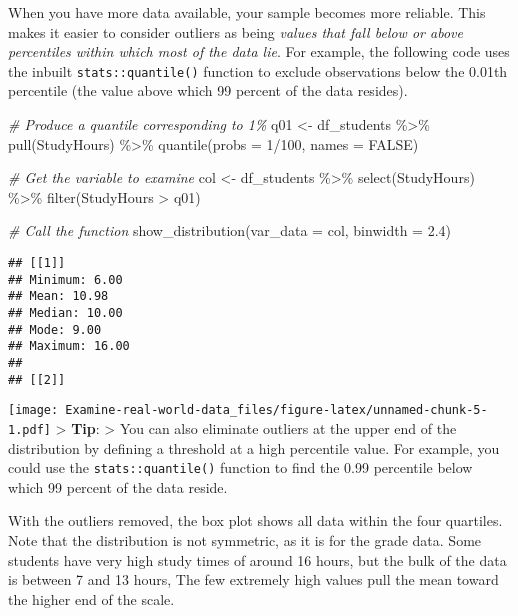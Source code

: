 \documentclass[
]{article}
\newenvironment{Shaded}{\begin{snugshade}}{\end{snugshade}}
\newcommand{\AttributeTok}[1]{\textcolor[rgb]{0.77,0.63,0.00}{#1}}
\newcommand{\CommentTok}[1]{\textcolor[rgb]{0.56,0.35,0.01}{\textit{#1}}}
\newcommand{\ConstantTok}[1]{\textcolor[rgb]{0.00,0.00,0.00}{#1}}
\newcommand{\DecValTok}[1]{\textcolor[rgb]{0.00,0.00,0.81}{#1}}
\newcommand{\FloatTok}[1]{\textcolor[rgb]{0.00,0.00,0.81}{#1}}
\newcommand{\FunctionTok}[1]{\textcolor[rgb]{0.00,0.00,0.00}{#1}}
\newcommand{\NormalTok}[1]{#1}
\newcommand{\OtherTok}[1]{\textcolor[rgb]{0.56,0.35,0.01}{#1}}
\newcommand{\SpecialCharTok}[1]{\textcolor[rgb]{0.00,0.00,0.00}{#1}}
\begin{document}
When you have more data available, your sample becomes more reliable.
This makes it easier to consider outliers as being \emph{values that
fall below or above percentiles within which most of the data lie}. For
example, the following code uses the inbuilt \texttt{stats::quantile()}
function to exclude observations below the 0.01th percentile (the value
above which 99 percent of the data resides).

\begin{Shaded}
\begin{Highlighting}[]
\CommentTok{\# Produce a quantile corresponding to 1\%}
\NormalTok{q01 }\OtherTok{\textless{}{-}}\NormalTok{ df\_students }\SpecialCharTok{\%\textgreater{}\%} 
  \FunctionTok{pull}\NormalTok{(StudyHours) }\SpecialCharTok{\%\textgreater{}\%} 
  \FunctionTok{quantile}\NormalTok{(}\AttributeTok{probs =} \DecValTok{1}\SpecialCharTok{/}\DecValTok{100}\NormalTok{, }\AttributeTok{names =} \ConstantTok{FALSE}\NormalTok{)}

\CommentTok{\# Get the variable to examine}
\NormalTok{col }\OtherTok{\textless{}{-}}\NormalTok{ df\_students }\SpecialCharTok{\%\textgreater{}\%} 
  \FunctionTok{select}\NormalTok{(StudyHours) }\SpecialCharTok{\%\textgreater{}\%} 
  \FunctionTok{filter}\NormalTok{(StudyHours }\SpecialCharTok{\textgreater{}}\NormalTok{ q01)}
  
\CommentTok{\# Call the function}
\FunctionTok{show\_distribution}\NormalTok{(}\AttributeTok{var\_data =}\NormalTok{ col, }\AttributeTok{binwidth =} \FloatTok{2.4}\NormalTok{)}
\end{Highlighting}
\end{Shaded}

\begin{verbatim}
## [[1]]
## Minimum: 6.00
## Mean: 10.98
## Median: 10.00
## Mode: 9.00
## Maximum: 16.00
## 
## [[2]]
\end{verbatim}

\texttt{[image: Examine-real-world-data\_files/figure-latex/unnamed-chunk-5-1.pdf]}
\textgreater{} \textbf{Tip}: \textgreater{} You can also eliminate
outliers at the upper end of the distribution by defining a threshold at
a high percentile value. For example, you could use the
\texttt{stats::quantile()} function to find the 0.99 percentile below
which 99 percent of the data reside.

With the outliers removed, the box plot shows all data within the four
quartiles. Note that the distribution is not symmetric, as it is for the
grade data. Some students have very high study times of around 16 hours,
but the bulk of the data is between 7 and 13 hours, The few extremely
high values pull the mean toward the higher end of the scale.
\end{document}

